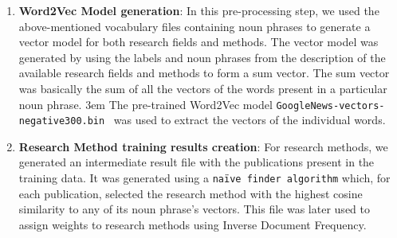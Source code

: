 \documentclass[runningheads]{llncs}
\begin{document}
\begin{enumerate}
		\smallskip
		\item \textbf{Word2Vec Model generation}: In this pre-processing step, we used the above-mentioned vocabulary files containing noun phrases to generate a vector model for both research fields and methods. %
		The vector model was generated by using the labels and noun phrases from the description of the available research fields and methods to form a sum vector. 
		The sum vector was basically the sum of all the vectors of the words present in a particular noun phrase. %
		\emergencystretch 3em {The pre-trained Word2Vec model \texttt{GoogleNews-vectors-negative300.bin}~\cite{DBLP:journals/corr/abs-1301-3781} was used to extract the vectors of the individual words.}
		\smallskip
		\item \textbf{Research Method training results creation}: For research methods, we generated an intermediate %
		result file with the publications present in the training data. %
		It was generated using a \texttt{naïve finder algorithm} which, for each publication, selected the research method with the highest cosine similarity to any of its noun phrase’s vectors. This file was later used to assign weights to research methods using Inverse Document Frequency.
	\end{enumerate}
	
	
	
\end{document}
